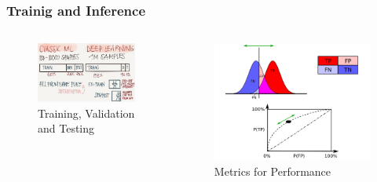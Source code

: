 \documentclass{ctexbeamer}
\begin{document}
\begin{frame}
  \frametitle{Trainig and Inference}
  \begin{columns}[T]
    \begin{column}{0.5\textwidth}
      \begin{figure}[H]
        \raggedright
        \includegraphics[width=\textwidth]{./figures/training.png}
        \caption{Training, Validation and Testing}
        \label{fig:training}
      \end{figure}
    \end{column}
    \begin{column}{0.5\textwidth}
      \begin{figure}[H]
        \raggedleft
        \includegraphics[width=\textwidth]{./figures/auc.png}
        \caption{Metrics for Performance}
        \label{fig:performance}
      \end{figure}
    \end{column}
  \end{columns}
\end{frame}
\end{document}
